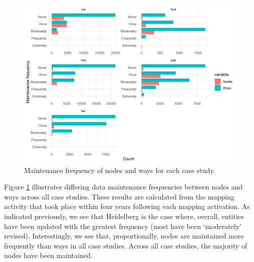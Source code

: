 \begin{figure} %
    \centering %
    \includegraphics[width = \textwidth]{Images/types.png} %
    \caption{Maintenance frequency of nodes and ways for each case study.} %
    \label{fig:types} %
\end{figure}

Figure \ref{fig:types} illustrates differing data maintenance frequencies between nodes and ways across all case studies. These results are calculated from the mapping activity that took place within four years following each mapping activation. As indicated previously, we see that Heidelberg is the case where, overall, entities have been updated with the greatest frequency (most have been ‘moderately’ revised). Interestingly, we see that, proportionally, nodes are maintained more frequently than ways in all case studies. Across all case studies, the majority of nodes have been maintained.  

